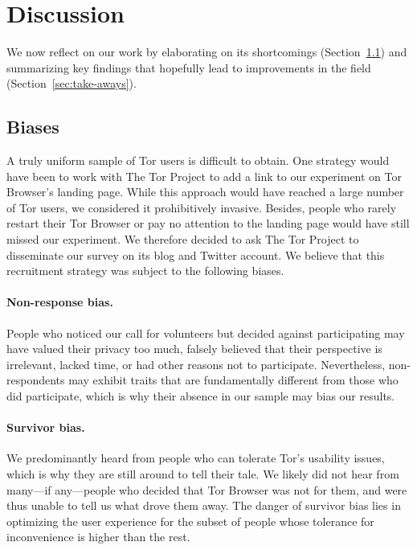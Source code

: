 \section{Discussion}
\label{sec:discussion}

We now reflect on our work by elaborating on its shortcomings
(Section~\ref{sec:biases}) and summarizing key findings that hopefully lead to
improvements in the field (Section~\ref{sec:take-aways}).

\subsection{Biases}
\label{sec:biases}

A truly uniform sample of Tor users is difficult to obtain.  One strategy would
have been to work with The Tor Project to add a link to our experiment on Tor
Browser's landing page.  While this approach would have reached a large number
of Tor users, we considered it prohibitively invasive.  Besides, people who
rarely restart their Tor Browser or pay no attention to the landing page would
have still missed our experiment.  We therefore decided to ask The Tor Project
to disseminate our survey on its blog and Twitter account.  We believe that this
recruitment strategy was subject to the following biases.

\paragraph{Non-response bias.}
People who noticed our call for volunteers but decided against participating may
have valued their privacy too much, falsely believed that their perspective is
irrelevant, lacked time, or had other reasons not to participate.  Nevertheless,
non-respondents may exhibit traits that are fundamentally different from those
who did participate, which is why their absence in our sample may bias our
results.

\paragraph{Survivor bias.}
We predominantly heard from people who can tolerate Tor's usability issues,
which is why they are still around to tell their tale.  We likely did not hear
from many---if any---people who decided that Tor Browser was not for them, and
were thus unable to tell us what drove them away.  The danger of survivor bias
lies in optimizing the user experience for the subset of people whose tolerance
for inconvenience is higher than the rest.

